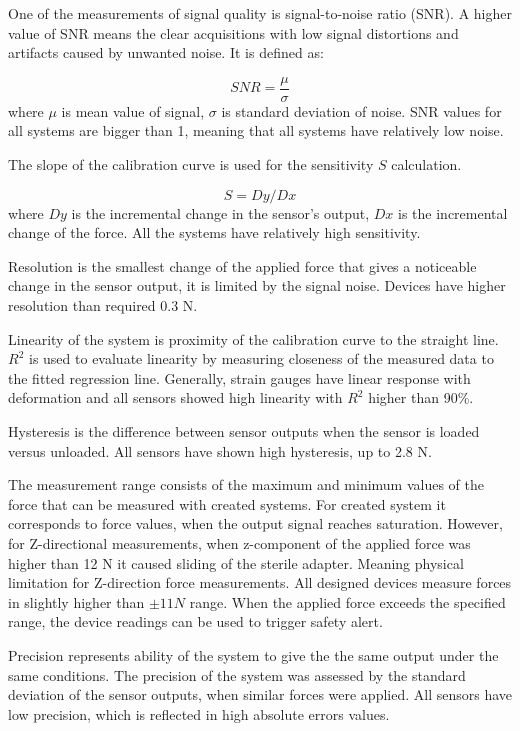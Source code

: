 One of the measurements of signal quality is signal-to-noise ratio (SNR). A higher value of SNR means the clear acquisitions with low signal distortions and artifacts caused by unwanted noise. It is defined as:

\begin{equation}
SNR=\frac{\mu}{\sigma}
\end{equation}
where $\mu$ is mean value of signal, $\sigma$ is standard deviation of noise. SNR values for all systems are bigger than 1, meaning that all systems have relatively low noise.

The slope of the calibration curve is used for the sensitivity $S$ calculation.

\begin{equation}
S = Dy/Dx
\end{equation}
where $Dy$ is the incremental change in the sensor’s output, $Dx$ is the incremental change of the force. All the systems have relatively high sensitivity.

Resolution is the smallest change of the applied force that gives a noticeable change in the sensor output, it is limited by the signal noise. Devices have higher resolution than required 0.3 N.

Linearity of the system is proximity of the calibration curve to the straight line. $R^2$ is used to evaluate linearity by measuring closeness of the measured data to the fitted regression line. Generally, strain gauges have linear response with deformation and all sensors showed high linearity with $R^2$ higher than 90\%.

Hysteresis is the difference between sensor outputs when the sensor is loaded versus unloaded. All sensors have shown high hysteresis, up to 2.8 N.

The measurement range consists of the maximum and minimum values of the force that can be measured with created systems. For created system it corresponds to force values, when the output signal reaches saturation. However, for Z-directional measurements, when z-component of the applied force was higher than 12 N it caused sliding of the sterile adapter. Meaning physical limitation for Z-direction force measurements. All designed devices measure forces in slightly higher than $\pm 11 N$ range. When the applied force exceeds the specified range, the device readings can be used to trigger safety alert.

Precision represents ability of the system to give the the same output under the same conditions. The precision of the system was assessed by the standard deviation of the sensor outputs, when similar forces were applied.  All sensors have low precision, which is reflected in high absolute errors values.

